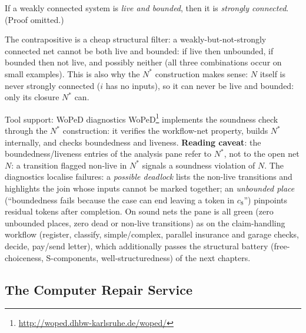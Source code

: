 \begin{theorem}
If a weakly connected system is \emph{live and bounded}, then it is \emph{strongly connected}. (Proof omitted.)
\end{theorem}

The contrapositive is a cheap structural filter: a weakly-but-not-strongly connected net cannot be both live and bounded: if live then unbounded, if bounded then not live, and possibly neither (all three combinations occur on small examples). This is also why the $N^*$ construction makes sense: $N$ itself is never strongly connected ($i$ has no inputs), so it can never be live and bounded: only its closure $N^*$ can.

\begin{notebox}{Tool support: WoPeD diagnostics}
WoPeD\footnote{\url{http://woped.dhbw-karlsruhe.de/woped/}} implements the soundness check through the $N^*$ construction: it verifies the workflow-net property, builds $N^*$ internally, and checks boundedness and liveness. \textbf{Reading caveat}: the boundedness/liveness entries of the analysis pane refer to $N^*$, not to the open net $N$: a transition flagged non-live in $N^*$ signals a soundness violation of $N$. The diagnostics localise failures: a \emph{possible deadlock} lists the non-live transitions and highlights the join whose inputs cannot be marked together; an \emph{unbounded place} (``boundedness fails because the case can end leaving a token in $c_8$'') pinpoints residual tokens after completion. On sound nets the pane is all green (zero unbounded places, zero dead or non-live transitions) as on the claim-handling workflow (register, classify, simple/complex, parallel insurance and garage checks, decide, pay/send letter), which additionally passes the structural battery (free-choiceness, S-components, well-structuredness) of the next chapters.
\end{notebox}

\subsection{The Computer Repair Service}

